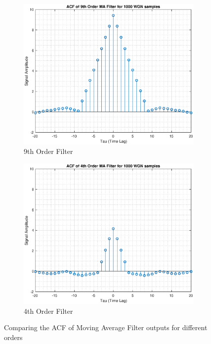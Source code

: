 \documentclass{article}
\begin{document}
\begin{figure}[h!]
\centering
\begin{subfigure}{0.32\textwidth}
\centering
\includegraphics[width = \textwidth]{acf_corr_9}
\caption{9th Order Filter}
\label{fig:acf_corr_9}
\end{subfigure}
\begin{subfigure}{0.32\textwidth}
\centering
\includegraphics[width = \textwidth]{acf_corr_4}
\caption{4th Order Filter}
\label{fig:acf_corr_4}
\end{subfigure}
\caption{Comparing the ACF of Moving Average Filter outputs for different orders}
\label{fig:acf_corr}
\end{figure}
\end{document}
